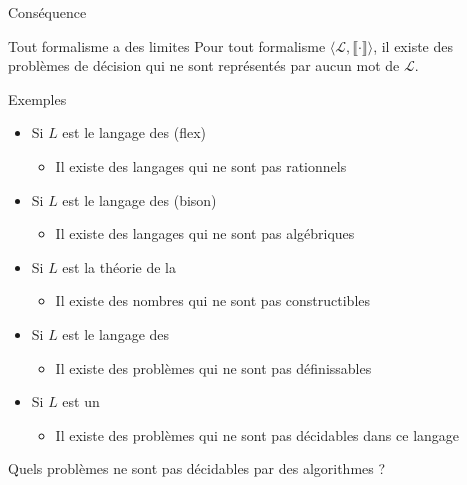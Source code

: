 
\begingroup


\begin{frame}{Conséquence}

  \begin{block}{Tout formalisme a des limites}
  Pour tout formalisme $\langle \mathcal{L}, \llbracket \cdot \rrbracket \rangle$, il existe des problèmes de décision qui ne sont représentés par aucun mot de $\mathcal{L}$.
  \end{block}
  
  \begin{exampleblock}{Exemples}
    \begin{itemize}
    \item Si $L$ est le langage des  (flex)
      \begin{itemize}
      \item Il existe des langages qui ne sont \alert{pas rationnels}
      \end{itemize}
    \item Si $L$ est le langage des  (bison)
      \begin{itemize}
      \item Il existe des langages qui ne sont \alert{pas algébriques}
      \end{itemize}
    \item Si $L$ est la théorie de la 
      \begin{itemize}
      \item Il existe des nombres qui ne sont \alert{pas constructibles}
      \end{itemize}
    \item Si $L$ est le langage des 
      \begin{itemize}
      \item Il existe des problèmes qui ne sont \alert{pas définissables}
      \end{itemize}
    \item Si $L$ est un 
      \begin{itemize}
      \item Il existe des problèmes qui ne sont \alert{pas décidables} dans ce langage
      \end{itemize}
    \end{itemize}
  \end{exampleblock}

  \begin{center}
    \alert{Quels problèmes ne sont pas décidables par des algorithmes ?}
  \end{center}

  
\end{frame}

\endgroup
\endinput
